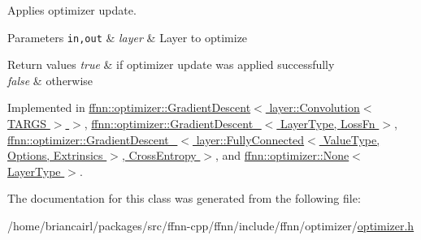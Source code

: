 Applies optimizer update. 


\begin{DoxyParams}[1]{Parameters}
\mbox{\tt in,out}  & {\em layer} & Layer to optimize \\
\hline
\end{DoxyParams}

\begin{DoxyRetVals}{Return values}
{\em true} & if optimizer update was applied successfully \\
\hline
{\em false} & otherwise \\
\hline
\end{DoxyRetVals}


Implemented in \hyperlink{classffnn_1_1optimizer_1_1_gradient_descent_3_01layer_1_1_convolution_3_01_t_a_r_g_s_01_4_01_4_a3cbbcd9490ff52ee7984bfcb17db4ee1}{ffnn\-::optimizer\-::\-Gradient\-Descent$<$ layer\-::\-Convolution$<$ T\-A\-R\-G\-S $>$ $>$}, \hyperlink{classffnn_1_1optimizer_1_1_gradient_descent___a90fface371af7bef89880d278a9b2007}{ffnn\-::optimizer\-::\-Gradient\-Descent\-\_\-$<$ Layer\-Type, Loss\-Fn $>$}, \hyperlink{classffnn_1_1optimizer_1_1_gradient_descent___a90fface371af7bef89880d278a9b2007}{ffnn\-::optimizer\-::\-Gradient\-Descent\-\_\-$<$ layer\-::\-Fully\-Connected$<$ Value\-Type, Options, Extrinsics $>$, Cross\-Entropy $>$}, and \hyperlink{classffnn_1_1optimizer_1_1_none_aa2d59b906b49fb976b50a810479637fd}{ffnn\-::optimizer\-::\-None$<$ Layer\-Type $>$}.



The documentation for this class was generated from the following file\-:\begin{DoxyCompactItemize}
\item 
/home/briancairl/packages/src/ffnn-\/cpp/ffnn/include/ffnn/optimizer/\hyperlink{optimizer_8h}{optimizer.\-h}\end{DoxyCompactItemize}
